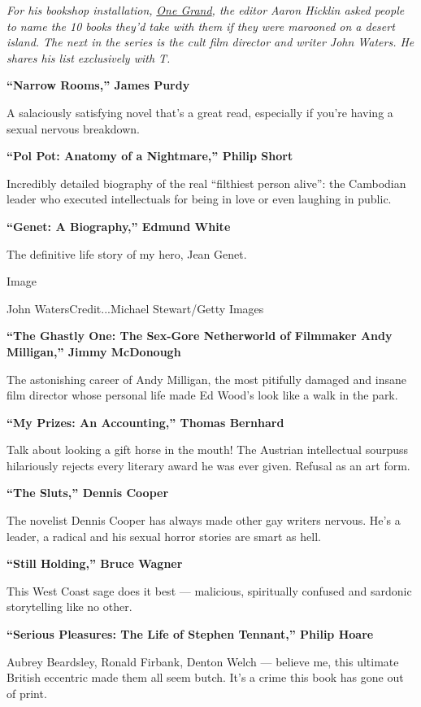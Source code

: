 \emph{For his bookshop installation,}
\href{http://onegrandbooks.com/}{\emph{One Grand}}\emph{, the editor
Aaron Hicklin asked people to name the 10 books they'd take with them if
they were marooned on a desert island. The next in the series is the
cult film director and writer John Waters. He shares his list
exclusively with T.}

\textbf{``Narrow Rooms,'' James Purdy}

A salaciously satisfying novel that's a great read, especially if you're
having a sexual nervous breakdown.

\textbf{``Pol Pot: Anatomy of a Nightmare,'' Philip Short}

Incredibly detailed biography of the real ``filthiest person alive'':
the Cambodian leader who executed intellectuals for being in love or
even laughing in public.

\textbf{``Genet: A Biography,'' Edmund White}

The definitive life story of my hero, Jean Genet.

Image

John WatersCredit...Michael Stewart/Getty Images

\textbf{``The Ghastly One: The Sex-Gore Netherworld of Filmmaker Andy
Milligan,'' Jimmy McDonough}

The astonishing career of Andy Milligan, the most pitifully damaged and
insane film director whose personal life made Ed Wood's look like a walk
in the park.

\textbf{``My Prizes: An Accounting,'' Thomas Bernhard}

Talk about looking a gift horse in the mouth! The Austrian intellectual
sourpuss hilariously rejects every literary award he was ever given.
Refusal as an art form.

\textbf{``The Sluts,'' Dennis Cooper}

The novelist Dennis Cooper has always made other gay writers nervous.
He's a leader, a radical and his sexual horror stories are smart as
hell.

\textbf{``Still Holding,'' Bruce Wagner}

This West Coast sage does it best --- malicious, spiritually confused
and sardonic storytelling like no other.

\textbf{``Serious Pleasures: The Life of Stephen Tennant,'' Philip
Hoare}

Aubrey Beardsley, Ronald Firbank, Denton Welch --- believe me, this
ultimate British eccentric made them all seem butch. It's a crime this
book has gone out of print.

